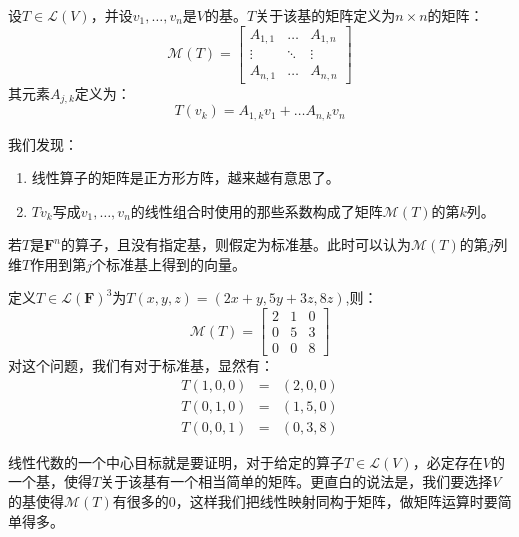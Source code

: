 \documentclass[10pt,a4paper,UTF8]{article}
\begin{document}
\begin{definition}
设\(T\in \mathcal{L}(V)\)，并设\(v_{1},\ldots ,v_{n}\)是\(V\)的基。\(T\)关于该基的矩阵定义为\(n\times n\)的矩阵：
\begin{equation}
\label{eq:4}
 \mathcal{M}(T) =
\begin{bmatrix}
A_{1,1} & \ldots & A_{1,n} \\
\vdots & \ddots & \vdots \\
A_{n,1} & \ldots & A_{n,n}
\end{bmatrix}
\end{equation}
其元素\(A_{j,k}\)定义为：
\begin{equation}
\label{eq:5}
T(v_{k}) = A_{1,k}v_{1} + \ldots A_{n,k}v_{n}
\end{equation}
\end{definition}
我们发现：
\begin{enumerate}
\item 线性算子的矩阵是正方形方阵，越来越有意思了。
\item \(Tv_{k}\)写成\(v_{1},\ldots ,v_{n}\)的线性组合时使用的那些系数构成了矩阵\(\mathcal{M}(T)\)的第\(k\)列。
\end{enumerate}

若\(T\)是\(\mathbf{F}^{n}\)的算子，且没有指定基，则假定为标准基。此时可以认为\(\mathcal{M}(T)\)的第\(j\)列维\(T\)作用到第\(j\)个标准基上得到的向量。

\begin{instance}
定义\(T\in \mathcal{L}(\mathbf{F})^{3}\)为\(T(x,y,z) = (2x+y,5y + 3z, 8z)\),则：
\begin{equation}
\label{eq:6}
\mathcal{M}(T) =
\begin{bmatrix}
2 & 1 & 0 \\
0 & 5 & 3 \\
0 & 0 & 8
\end{bmatrix}
\end{equation}
对这个问题，我们有对于标准基，显然有：
\begin{eqnarray}
\label{eq:7}
T(1,0,0)&=&(2,0,0) \\
T(0,1,0)&=&(1,5,0) \\
T(0,0,1)&=&(0,3,8)
\end{eqnarray}
\end{instance}
线性代数的一个中心目标就是要证明，对于给定的算子\(T\in \mathcal{L}(V)\)，必定存在\(V\)的一个基，使得\(T\)关于该基有一个相当简单的矩阵。更直白的说法是，我们要选择\(V\)的基使得\(\mathcal{M}(T)\)有很多的\(0\)，这样我们把线性映射同构于矩阵，做矩阵运算时要简单得多。
\end{document}
